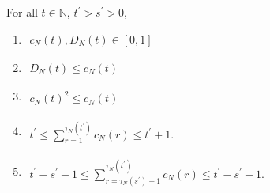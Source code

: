 \begin{prop}[Properties of $c_N$]\label{thm:cN_properties}
For all $t\in\mathbb{N}$, $t^\prime > s^\prime >0$,
\begin{enumerate}[label=(\alph*)]
\item \label{item:cN_property1} \hspace{5pt}
    $\begin{aligned}
    c_N(t) , D_N(t) \in [0,1]
    \end{aligned}$
\item \label{item:cN_property2} \hspace{5pt}
    $\begin{aligned}
    D_N(t) \leq c_N(t)
    \end{aligned}$
\item \label{item:cN_property3} \hspace{5pt}
    $\begin{aligned}
    c_N(t)^2 \leq c_N(t) 
    \end{aligned}$
\item \label{item:cN_property4} \hspace{5pt}
    $\begin{aligned}
    t^\prime
    \leq \sum_{r=1}^{\tau_N(t^\prime)} c_N(r) 
    \leq t^\prime +1 .
    \end{aligned}$
\item \label{item:cN_property5} \hspace{5pt}
    $\begin{aligned}
    t^\prime - s^\prime -1
    \leq \sum_{r=\tau_N(s^\prime)+1}^{\tau_N(t^\prime)} c_N(r) 
    \leq t^\prime - s^\prime +1 .
    \end{aligned}$
\end{enumerate}
\end{prop}

